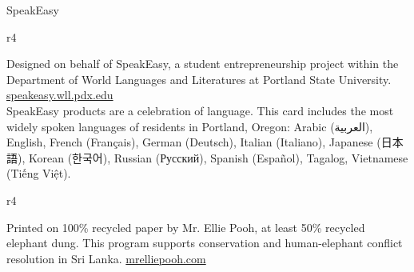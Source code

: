 \documentclass[10pt,letter]{article}
\newcommand\japanesefont{\CJKfamily{jarm}\CJKnospace}
\newcommand\koreanfont{\CJKfamily{korm}\CJKspace}
\newcommand{\langSpanish}{Español}
\newcommand{\langGerman}{Deutsch}
\newcommand{\langVietnamese}{Tiếng Việt}
\newcommand{\langRussian}{Русский}
\newcommand{\langFrench}{Français}
\newcommand{\langJapanese}{日本語}
\newcommand{\langKorean}{한국어}
\newcommand{\langArabic}{العربية}
\newcommand{\langItalian}{Italiano}
\begin{document}

\begin{backcover}

  \vfill

  \begin{center}
    \small
    SpeakEasy
  \end{center}

  \vfill

  \footnotesize

  \begin{wrapfigure}[4]{r}{4\baselineskip}
    \centering
    \vspace{-1.4\baselineskip}
    \href{https://goo.gl/uoKYLW}{
    }
  \end{wrapfigure}
  Designed on behalf of SpeakEasy, a student
  entrepreneurship project within the Department of World Languages and
  Literatures at Portland State University.
  \hfill \href{http://speakeasy.wll.pdx.edu/}{speakeasy.wll.pdx.edu}
  \\[0.5 em]

  SpeakEasy products are a celebration of language. This card includes the most
  widely spoken languages of residents in Portland, Oregon:
  Arabic (\textarabic{\langArabic{}}),
  English, %
  French (\textfrench{\langFrench{}}),
  German (\textgerman{\langGerman{}}),
  Italian (\textitalian{\langItalian{}}),
  Japanese ({\japanesefont{}\langJapanese{}}),
  Korean ({\koreanfont{}\langKorean{}}),
  Russian (\textrussian{\langRussian{}}),
  Spanish (\textspanish{\langSpanish{}}),
  Tagalog, %
  Vietnamese (\textvietnamese{\langVietnamese{}}).
  \\[0.5 em]

  \begin{wrapfigure}[4]{r}{4\baselineskip}
    \centering
    \vspace{-1.4\baselineskip}
    \href{https://goo.gl/NXG25H}{
    }
  \end{wrapfigure}
  Printed on 100\% recycled paper by Mr. Ellie Pooh, at least 50\% recycled
  elephant dung. This program supports conservation and human-elephant conflict
  resolution in Sri Lanka. \hfill
  \href{http://mrelliepooh.com/}{mrelliepooh.com}


\end{backcover}
\end{document}
